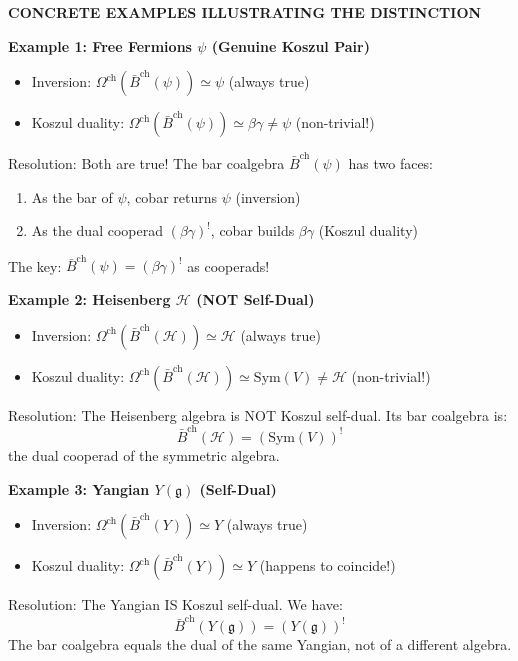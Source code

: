 \begin{remark}
\medskip
\noindent\textbf{CONCRETE EXAMPLES ILLUSTRATING THE DISTINCTION}

\textbf{Example 1: Free Fermions $\psi$ (Genuine Koszul Pair)}
\begin{itemize}
\item Inversion: $\Omega^{\text{ch}}(\bar{B}^{\text{ch}}(\psi)) \simeq \psi$ \checkmark \quad (always true)
\item Koszul duality: $\Omega^{\text{ch}}(\bar{B}^{\text{ch}}(\psi)) \simeq \beta\gamma \neq \psi$ \checkmark \quad (non-trivial!)
\end{itemize}
Resolution: Both are true! The bar coalgebra $\bar{B}^{\text{ch}}(\psi)$ has two faces:
\begin{enumerate}
\item As the bar of $\psi$, cobar returns $\psi$ (inversion)
\item As the dual cooperad $(\beta\gamma)^!$, cobar builds $\beta\gamma$ (Koszul duality)
\end{enumerate}
The key: $\bar{B}^{\text{ch}}(\psi) = (\beta\gamma)^!$ as cooperads!

\textbf{Example 2: Heisenberg $\mathcal{H}$ (NOT Self-Dual)}
\begin{itemize}
\item Inversion: $\Omega^{\text{ch}}(\bar{B}^{\text{ch}}(\mathcal{H})) \simeq \mathcal{H}$ \checkmark \quad (always true)
\item Koszul duality: $\Omega^{\text{ch}}(\bar{B}^{\text{ch}}(\mathcal{H})) \simeq \text{Sym}(V) \neq \mathcal{H}$ \checkmark \quad (non-trivial!)
\end{itemize}
Resolution: The Heisenberg algebra is NOT Koszul self-dual. Its bar coalgebra is:
$$\bar{B}^{\text{ch}}(\mathcal{H}) = (\text{Sym}(V))^!$$
the dual cooperad of the symmetric algebra.

\textbf{Example 3: Yangian $Y(\mathfrak{g})$ (Self-Dual)}
\begin{itemize}
\item Inversion: $\Omega^{\text{ch}}(\bar{B}^{\text{ch}}(Y)) \simeq Y$ \checkmark \quad (always true)
\item Koszul duality: $\Omega^{\text{ch}}(\bar{B}^{\text{ch}}(Y)) \simeq Y$ \checkmark \quad (happens to coincide!)
\end{itemize}
Resolution: The Yangian IS Koszul self-dual. We have:
$$\bar{B}^{\text{ch}}(Y(\mathfrak{g})) = (Y(\mathfrak{g}))^!$$
The bar coalgebra equals the dual of the same Yangian, not of a different algebra.


\end{remark}
